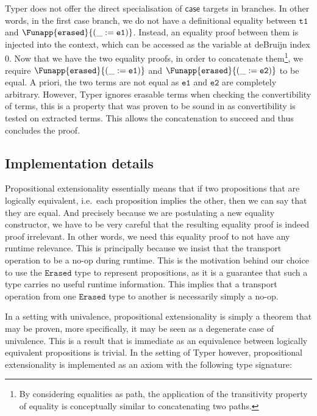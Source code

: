 \documentclass[12pt,twoside,maitrise]{dms}
\theoremstyle{definition}
\numberwithin{equation}{section}
\numberwithin{table}{chapter}
\numberwithin{figure}{chapter}
\newcommand\kw[1] {\textsf{#1}}
\newcommand\id[1] {\texttt{#1}}
\begin{document}
Typer does not offer the direct specialisation of $\kw{case}$ targets in
branches. In other words, in the first case branch, we do not have a
definitional equality between $\id{t1}$ and
$\Funapp{\id{erased}}{(\earg{\_}{\id{e1}})}$. Instead, an equality proof between
them is injected into the context, which can be accessed as the variable at
deBruijn index 0. Now that we have the two equality proofs, in order to
concatenate them\footnote{By considering equalities as path, the application of
the transitivity property of equality is conceptually similar to concatenating
two paths.}, we require $\Funapp{\id{erased}}{(\earg{\_}{\id{e1}})}$ and
$\Funapp{\id{erased}}{(\earg{\_}{\id{e2}})}$ to be equal. A priori, the two
terms are not equal as $\id{e1}$ and $\id{e2}$ are completely arbitrary.
However, Typer ignores erasable terms when checking the convertibility of terms,
this is a property that was proven to be sound in\cite{barras2008implicit} as
convertibility is tested on extracted terms. This allows the concatenation to
succeed and thus concludes the proof.

\subsection*{Implementation details}

Propositional extensionality essentially means that if two propositions that are
logically equivalent, i.e.\ each proposition implies the other, then we can say
that they are equal. And precisely because we are postulating a new equality
constructor, we have to be very careful that the resulting equality proof is
indeed proof irrelevant. In other words, we need this equality proof to not have
any runtime relevance. This is principally because we insist that the transport
operation to be a no-op during runtime. This is the motivation behind our choice
to use the $\id{Erased}$ type to represent propositions, as it is a guarantee
that such a type carries no useful runtime information. This implies that a
transport operation from one $\id{Erased}$ type to another is necessarily simply
a no-op.

In a setting with univalence, propositional extensionality is simply a theorem
that may be proven, more specifically, it may be seen as a degenerate case of univalence\cite{sozeau2013univalence}. This is a result that is
immediate as an equivalence between logically equivalent propositions is
trivial. In the setting of Typer however, propositional extensionality is
implemented as an axiom with the following type signature:
\end{document}
